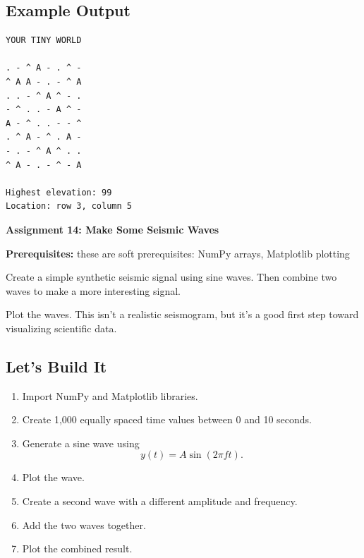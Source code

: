 \documentclass[11pt,letterpaper]{article}
\newcommand{\assignment}[3]{
    \clearpage
    {\Large\bfseries\color{navy} Assignment #1: #2}

    \vspace{2mm}
    {\small\color{darkgray}\textbf{Prerequisites:} #3}

    \vspace{3mm}
}
\newcommand{\steps}{\subsection*{Let's Build It}}
\newcommand{\exampleoutput}{\subsection*{Example Output}}
\begin{document}
\exampleoutput

\begin{lstlisting}[style=outputstyle]
YOUR TINY WORLD

. - ^ A - . ^ -
^ A A - . - ^ A
. . - ^ A ^ - .
- ^ . . - A ^ -
A - ^ . . - - ^
. ^ A - ^ . A -
- . - ^ A ^ . .
^ A - . - ^ - A

Highest elevation: 99
Location: row 3, column 5
\end{lstlisting}

\assignment{14}{Make Some Seismic Waves}
{these are soft prerequisites: NumPy arrays, Matplotlib plotting}

\begin{missionbox}
Create a simple synthetic seismic signal using sine waves. Then combine two waves to make a more interesting signal.

Plot the waves. This isn't a realistic seismogram, but it's a good first step toward visualizing scientific data.
\end{missionbox}

\steps

\begin{enumerate}
    \item Import NumPy and Matplotlib libraries.
    \item Create 1,000 equally spaced time values
    between 0 and 10 seconds.
    \item Generate a sine wave using
    \[
    y(t)=A\sin(2\pi ft).
    \]
    \item Plot the wave.
    \item Create a second wave with a different amplitude and frequency.
    \item Add the two waves together.
    \item Plot the combined result.
\end{enumerate}
\end{document}

